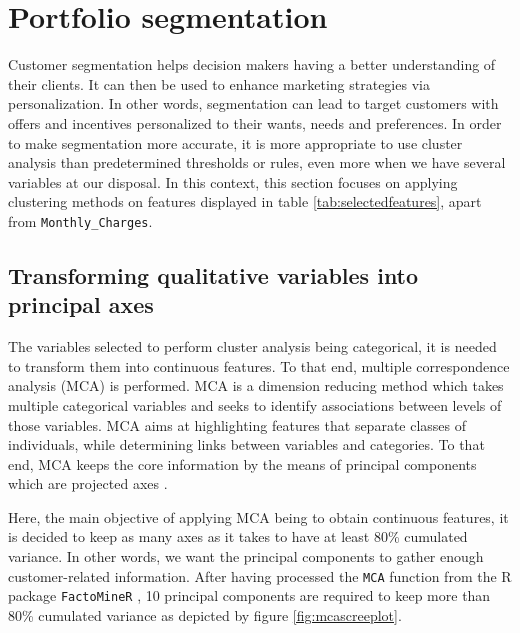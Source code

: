 \documentclass[
]{book}
\begin{document}
\hypertarget{segmentation}{%
\section{Portfolio segmentation}\label{segmentation}}

Customer segmentation helps decision makers having a better understanding of their clients. It can then be used to enhance marketing strategies via personalization. In other words, segmentation can lead to target customers with offers and incentives personalized to their wants, needs and preferences. In order to make segmentation more accurate, it is more appropriate to use cluster analysis than predetermined thresholds or rules, even more when we have several variables at our disposal. In this context, this section focuses on applying clustering methods on features displayed in table \ref{tab:selectedfeatures}, apart from \texttt{Monthly\_Charges}.

\hypertarget{transforming-qualitative-variables-into-principal-axes}{%
\subsection{Transforming qualitative variables into principal axes}\label{transforming-qualitative-variables-into-principal-axes}}

The variables selected to perform cluster analysis being categorical, it is needed to transform them into continuous features. To that end, multiple correspondence analysis (MCA) is performed. MCA is a dimension reducing method which takes multiple categorical variables and seeks to identify associations between levels of those variables. MCA aims at highlighting features that separate classes of individuals, while determining links between variables and categories. To that end, MCA keeps the core information by the means of principal components which are projected axes \citep{MCA}.

Here, the main objective of applying MCA being to obtain continuous features, it is decided to keep as many axes as it takes to have at least 80\% cumulated variance. In other words, we want the principal components to gather enough customer-related information. After having processed the \texttt{MCA} function from the R package \texttt{FactoMineR} \citep{FactoMineR2008}, 10 principal components are required to keep more than 80\% cumulated variance as depicted by figure \ref{fig:mcascreeplot}.
\end{document}
